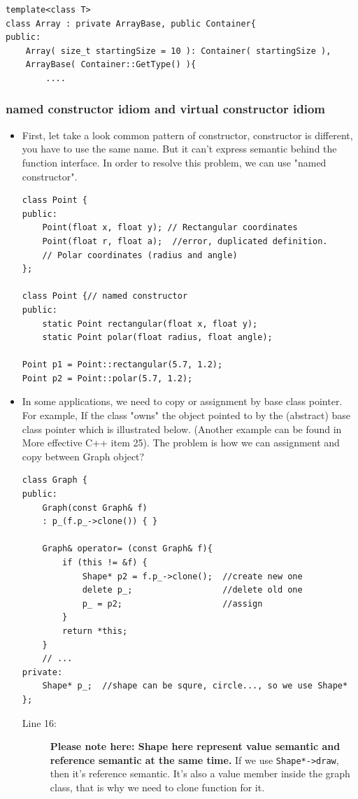\documentclass[a4paper,11pt,twoside]{book}
\begin{document}
\begin{itemize}
\begin{lstlisting}[numbers=none]
template<class T>
class Array : private ArrayBase, public Container{
public:
	Array( size_t startingSize = 10 ): Container( startingSize ), 
	ArrayBase( Container::GetType() ){
		....
\end{lstlisting}
		
	\end{itemize}

\subsubsection{named constructor idiom and virtual constructor idiom}
\begin{itemize}
	\item First, let take a look common pattern of constructor, constructor is different, you have to use the same name. But it can't express semantic behind the function interface. In order to resolve this problem, we can use "named constructor". 
\begin{lstlisting}
class Point {
public:
	Point(float x, float y); // Rectangular coordinates
	Point(float r, float a);  //error, duplicated definition. 
	// Polar coordinates (radius and angle)
};

class Point {// named constructor
public:
	static Point rectangular(float x, float y);
	static Point polar(float radius, float angle);
	
Point p1 = Point::rectangular(5.7, 1.2);
Point p2 = Point::polar(5.7, 1.2);
\end{lstlisting}
	
	\item In some applications, we need to copy or assignment by base class pointer. For example, If the class "owns" the object pointed to by the (abstract) base class pointer which is illustrated below. (Another example can be found in More effective C++ item 25). The problem is how we can assignment and copy between Graph object? 
	
\begin{lstlisting}
class Graph {
public:
	Graph(const Graph& f)
	: p_(f.p_->clone()) { }
	
	Graph& operator= (const Graph& f){
		if (this != &f) {              
			Shape* p2 = f.p_->clone();  //create new one 
			delete p_;                  //delete old one 
			p_ = p2;                    //assign
		}
		return *this;
	}
	// ...
private:
	Shape* p_;  //shape can be squre, circle..., so we use Shape*
};
\end{lstlisting}
\begin{description}
	\item[Line 16:]  \textbf{Please note here: Shape here represent value semantic and reference semantic at the same time.} If we use \texttt{Shape*->draw}, then it's reference semantic. It's also a value member inside the graph class, that is why we need to clone function for it.
\end{description}


\end{itemize}
\end{document}
